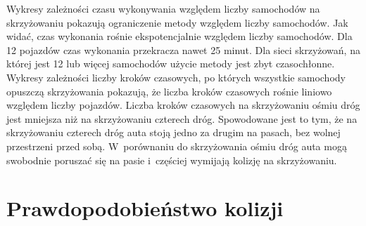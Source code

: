 Wykresy zależności czasu wykonywania względem liczby samochodów na skrzyżowaniu pokazują ograniczenie metody względem liczby samochodów. Jak widać, czas wykonania rośnie ekspotencjalnie względem liczby samochodów. Dla 12 pojazdów czas wykonania przekracza nawet 25 minut. Dla sieci skrzyżowań, na której jest 12 lub więcej samochodów użycie metody jest zbyt czasochłonne.
\newline
\indent
Wykresy zależności liczby kroków czasowych, po których wszystkie samochody opuszczą skrzyżowania pokazują, że liczba kroków czasowych rośnie liniowo względem liczby pojazdów. 
\newline
\indent
Liczba kroków czasowych na skrzyżowaniu ośmiu dróg jest mniejsza niż na skrzyżowaniu czterech dróg. Spowodowane jest to tym, że na skrzyżowaniu czterech dróg auta stoją jedno za drugim na pasach, bez wolnej przestrzeni przed sobą. W~porównaniu do skrzyżowania ośmiu dróg auta mogą swobodnie poruszać się na pasie i~częściej wymijają kolizję na skrzyżowaniu.

\section{Prawdopodobieństwo kolizji}

